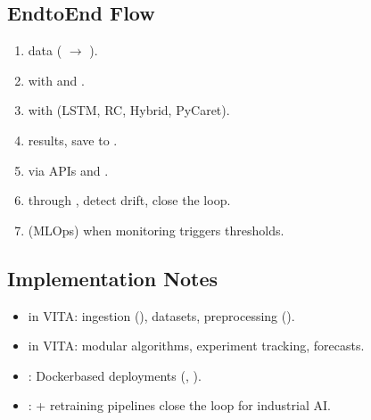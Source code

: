 \documentclass[letterpaper,10pt,english]{sphinxmanual}
\begin{document}
\subsection{End\sphinxhyphen{}to\sphinxhyphen{}End Flow}
\label{\detokenize{dataflow:end-to-end-flow}}\begin{enumerate}
%
\item {} 
\sphinxAtStartPar
{} data ( \(\rightarrow\) ).

\item {} 
\sphinxAtStartPar
{} with  and .

\item {} 
\sphinxAtStartPar
{} with  (LSTM, RC, Hybrid, PyCaret).

\item {} 
\sphinxAtStartPar
{} results, save to .

\item {} 
\sphinxAtStartPar
{} via  APIs and .

\item {} 
\sphinxAtStartPar
{} through , detect drift, close the loop.

\item {} 
\sphinxAtStartPar
{} (MLOps) when monitoring triggers thresholds.

\end{enumerate}


\subsection{Implementation Notes}
\label{\detokenize{dataflow:implementation-notes}}\begin{itemize}
\item {} 
\sphinxAtStartPar
{} in VITA: ingestion (), datasets, preprocessing ().

\item {} 
\sphinxAtStartPar
{} in VITA: modular algorithms, experiment tracking, forecasts.

\item {} 
\sphinxAtStartPar
{}: Docker\sphinxhyphen{}based deployments (, ).

\item {} 
\sphinxAtStartPar
{}:  + retraining pipelines close the loop for industrial AI.

\end{itemize}
\end{document}

